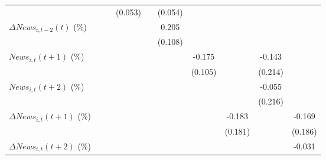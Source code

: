 {\begin{tabular}{l*{9}{c}}
                    &                     &                     &     (0.053)         &                     &     (0.054)         &                     &                     &                     &                     \\
\addlinespace
$ \Delta News_{i,t-2}(t)$ (\%)&                     &                     &                     &                     &       0.205\sym{*}  &                     &                     &                     &                     \\
                    &                     &                     &                     &                     &     (0.108)         &                     &                     &                     &                     \\
\addlinespace
$ News_{i,t}(t+1)$ (\%)&                     &                     &                     &                     &                     &      -0.175         &                     &      -0.143         &                     \\
                    &                     &                     &                     &                     &                     &     (0.105)         &                     &     (0.214)         &                     \\
\addlinespace
$ News_{i,t}(t+2)$ (\%)&                     &                     &                     &                     &                     &                     &                     &      -0.055         &                     \\
                    &                     &                     &                     &                     &                     &                     &                     &     (0.216)         &                     \\
\addlinespace
$ \Delta News_{i,t}(t+1)$ (\%)&                     &                     &                     &                     &                     &                     &      -0.183         &                     &      -0.169         \\
                    &                     &                     &                     &                     &                     &                     &     (0.181)         &                     &     (0.186)         \\
\addlinespace
$ \Delta News_{i,t}(t+2)$ (\%)&                     &                     &                     &                     &                     &                     &                     &                     &      -0.031         \\

\end{tabular}}
